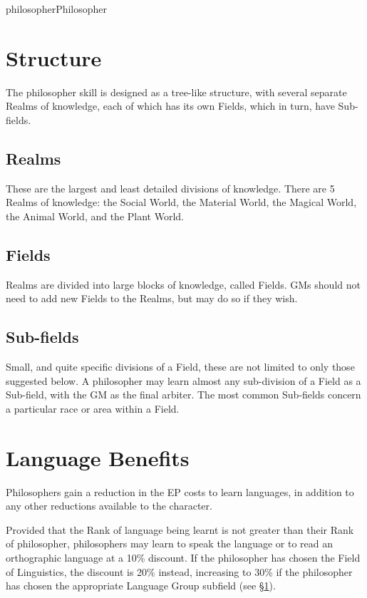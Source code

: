 \begin{Skill}[2.0]{philosopher}{Philosopher}
\section{Structure}
\label{philosopher:structure}

The philosopher skill is designed as a tree-like structure, with
several separate Realms of knowledge, each of which has its own
Fields, which in turn, have Sub-fields.

\subsection{Realms}

These are the largest and least detailed divisions of knowledge. There
are 5 Realms of knowledge: the Social World, the Material World, the
Magical World, the Animal World, and the Plant World.

\subsection{Fields}

Realms are divided into large blocks of knowledge, called Fields.  GMs
should not need to add new Fields to the Realms, but may do so if they
wish.

\subsection{Sub-fields}

Small, and quite specific divisions of a Field, these are not limited
to only those suggested below.  A philosopher may learn almost any
sub-division of a Field as a Sub-field, with the GM as the final
arbiter.  The most common Sub-fields concern a particular race or
area within a Field.

\section{Language Benefits}

Philosophers gain a reduction in the EP costs to learn languages, in
addition to any other reductions available to the character.

Provided that the Rank of language being learnt is not greater than
their Rank of philosopher, philosophers may learn to speak the
language or to read an orthographic language at a 10\% discount.  If
the philosopher has chosen the Field of Linguistics, the discount is
20\% instead, increasing to 30\% if the philosopher has chosen the
appropriate Language Group subfield (see
\S\ref{philosopher:structure}).


\end{Skill}
